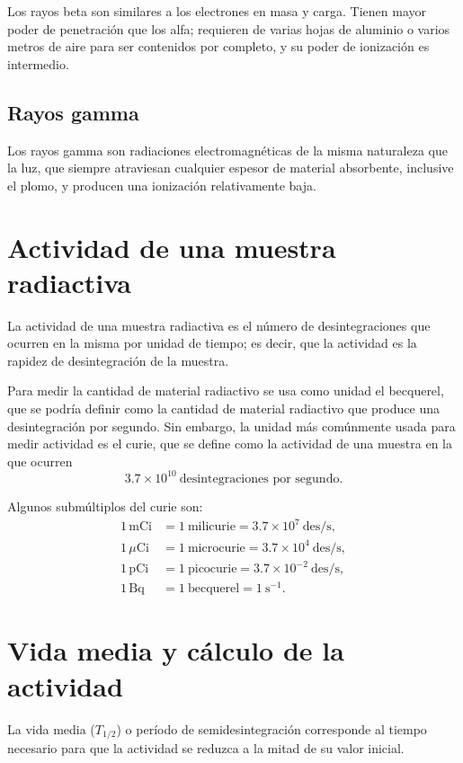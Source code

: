 Los rayos beta son similares a los electrones en masa y carga. Tienen mayor poder de penetración que los alfa; requieren de varias hojas de aluminio o varios metros de aire para ser contenidos por completo, y su poder de ionización es intermedio.

\subsection{Rayos gamma}

Los rayos gamma son radiaciones electromagnéticas de la misma naturaleza que la luz, que siempre atraviesan cualquier espesor de material absorbente, inclusive el plomo, y producen una ionización relativamente baja.

\section{Actividad de una muestra radiactiva}

La actividad de una muestra radiactiva es el número de desintegraciones que ocurren en la misma por unidad de tiempo; es decir, que la actividad es la rapidez de desintegración de la muestra.

Para medir la cantidad de material radiactivo se usa como unidad el becquerel, que se podría definir como la cantidad de material radiactivo que produce una desintegración por segundo. Sin embargo, la unidad más comúnmente usada para medir actividad es el curie, que se define como la actividad de una muestra en la que ocurren
\[
3.7\times 10^{10}\ \text{desintegraciones por segundo}.
\]

Algunos submúltiplos del curie son:
\begin{align*}
  1\,\mathrm{mCi} &= 1\ \text{milicurie} = 3.7\times 10^{7}\ \text{des/s},\\
  1\,\mu\mathrm{Ci} &= 1\ \text{microcurie} = 3.7\times 10^{4}\ \text{des/s},\\
  1\,\mathrm{pCi} &= 1\ \text{picocurie} = 3.7\times 10^{-2}\ \text{des/s},\\
  1\,\mathrm{Bq} &= 1\ \text{becquerel} = 1\ \mathrm{s}^{-1}.
\end{align*}

\section{Vida media y cálculo de la actividad}

La vida media ($T_{1/2}$) o período de semidesintegración corresponde al tiempo necesario para que la actividad se reduzca a la mitad de su valor inicial.

